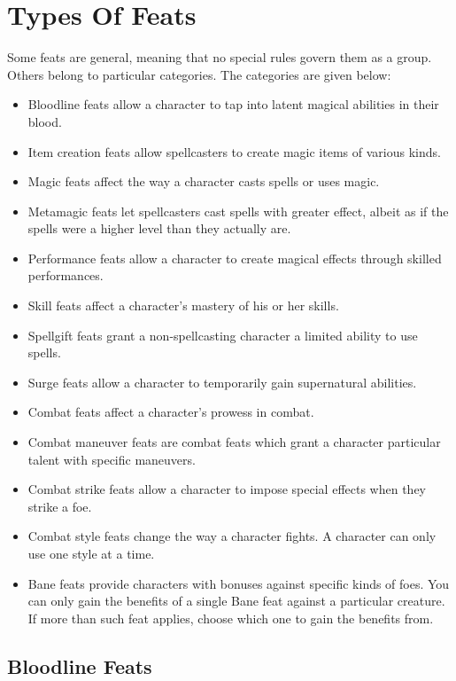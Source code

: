 \section{Types Of Feats}
Some feats are general, meaning that no special rules govern
them as a group. Others belong to particular categories. The categories are given below:
\begin{itemize}
    \item Bloodline feats allow a character to tap into latent magical abilities in their blood.
    \item Item creation feats allow spellcasters to create magic items of various kinds.
    \item Magic feats affect the way a character casts spells or uses magic.
    \item Metamagic feats let spellcasters cast spells with greater effect, albeit as if the spells were a higher level than they actually are.
    \item Performance feats allow a character to create magical effects through skilled performances.
    \item Skill feats affect a character's mastery of his or her skills.
    \item Spellgift feats grant a non-spellcasting character a limited ability to use spells.
    \item Surge feats allow a character to temporarily gain supernatural abilities.
    \item Combat feats affect a character's prowess in combat.
    \item Combat maneuver feats are combat feats which grant a character particular talent with specific maneuvers.
    \item Combat strike feats allow a character to impose special effects when they strike a foe.
    \item Combat style feats change the way a character fights. A character can only use one style at a time.
    \item Bane feats provide characters with bonuses against specific kinds of foes. You can only gain the benefits of a single Bane feat against a particular creature. If more than such feat applies, choose which one to gain the benefits from.
\end{itemize}

\subsection{Bloodline Feats}

